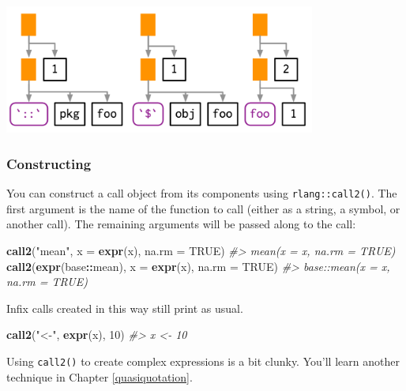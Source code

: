 \documentclass[]{book}
\makeatletter
\newenvironment{Shaded}{\begin{snugshade}}{\end{snugshade}}
\newcommand{\CommentTok}[1]{\textcolor[rgb]{0.37,0.37,0.37}{\textit{#1}}}
\newcommand{\DataTypeTok}[1]{\textcolor[rgb]{0.27,0.27,0.27}{#1}}
\newcommand{\DecValTok}[1]{\textcolor[rgb]{0.06,0.06,0.06}{#1}}
\newcommand{\KeywordTok}[1]{\textcolor[rgb]{0.27,0.27,0.27}{\textbf{#1}}}
\newcommand{\NormalTok}[1]{#1}
\newcommand{\OperatorTok}[1]{\textcolor[rgb]{0.43,0.43,0.43}{\textbf{#1}}}
\newcommand{\OtherTok}[1]{\textcolor[rgb]{0.37,0.37,0.37}{#1}}
\newcommand{\StringTok}[1]{\textcolor[rgb]{0.5,0.5,0.5}{#1}}
\newcommand{\indexc}[1]{\index{#1@\texttt{#1}}}
\makeatother
\begin{document}
\begin{center}\includegraphics[width=4.03in]{diagrams/expressions/call-call} \end{center}

\hypertarget{call2}{%
\subsubsection{Constructing}\label{call2}}

\indexc{call2()}

You can construct a call object from its components using \texttt{rlang::call2()}. The first argument is the name of the function to call (either as a string, a symbol, or another call). The remaining arguments will be passed along to the call:

\begin{Shaded}
\begin{Highlighting}[]
\KeywordTok{call2}\NormalTok{(}\StringTok{"mean"}\NormalTok{, }\DataTypeTok{x =} \KeywordTok{expr}\NormalTok{(x), }\DataTypeTok{na.rm =} \OtherTok{TRUE}\NormalTok{)}
\CommentTok{#> mean(x = x, na.rm = TRUE)}
\KeywordTok{call2}\NormalTok{(}\KeywordTok{expr}\NormalTok{(base}\OperatorTok{::}\NormalTok{mean), }\DataTypeTok{x =} \KeywordTok{expr}\NormalTok{(x), }\DataTypeTok{na.rm =} \OtherTok{TRUE}\NormalTok{)}
\CommentTok{#> base::mean(x = x, na.rm = TRUE)}
\end{Highlighting}
\end{Shaded}

Infix calls created in this way still print as usual.

\begin{Shaded}
\begin{Highlighting}[]
\KeywordTok{call2}\NormalTok{(}\StringTok{"<-"}\NormalTok{, }\KeywordTok{expr}\NormalTok{(x), }\DecValTok{10}\NormalTok{)}
\CommentTok{#> x <- 10}
\end{Highlighting}
\end{Shaded}

Using \texttt{call2()} to create complex expressions is a bit clunky. You'll learn another technique in Chapter \ref{quasiquotation}.
\end{document}
